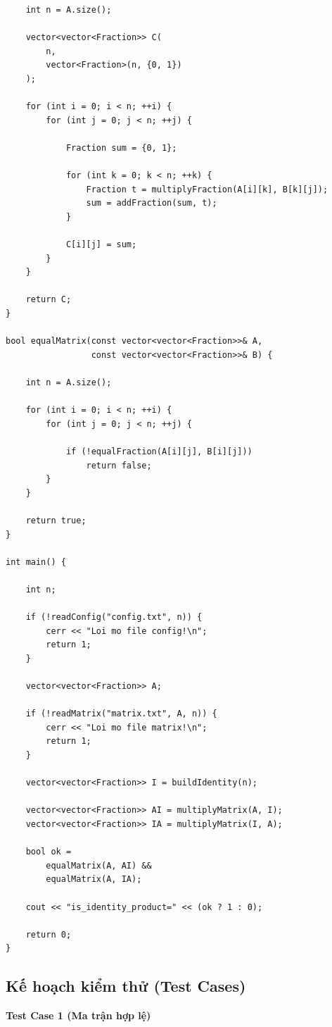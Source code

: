 \begin{lstlisting}
    int n = A.size();

    vector<vector<Fraction>> C(
        n,
        vector<Fraction>(n, {0, 1})
    );

    for (int i = 0; i < n; ++i) {
        for (int j = 0; j < n; ++j) {

            Fraction sum = {0, 1};

            for (int k = 0; k < n; ++k) {
                Fraction t = multiplyFraction(A[i][k], B[k][j]);
                sum = addFraction(sum, t);
            }

            C[i][j] = sum;
        }
    }

    return C;
}

bool equalMatrix(const vector<vector<Fraction>>& A,
                 const vector<vector<Fraction>>& B) {

    int n = A.size();

    for (int i = 0; i < n; ++i) {
        for (int j = 0; j < n; ++j) {

            if (!equalFraction(A[i][j], B[i][j]))
                return false;
        }
    }

    return true;
}

int main() {

    int n;

    if (!readConfig("config.txt", n)) {
        cerr << "Loi mo file config!\n";
        return 1;
    }

    vector<vector<Fraction>> A;

    if (!readMatrix("matrix.txt", A, n)) {
        cerr << "Loi mo file matrix!\n";
        return 1;
    }

    vector<vector<Fraction>> I = buildIdentity(n);

    vector<vector<Fraction>> AI = multiplyMatrix(A, I);
    vector<vector<Fraction>> IA = multiplyMatrix(I, A);

    bool ok =
        equalMatrix(A, AI) &&
        equalMatrix(A, IA);

    cout << "is_identity_product=" << (ok ? 1 : 0);

    return 0;
}
\end{lstlisting}

\subsection{Kế hoạch kiểm thử (Test Cases)}

\textbf{Test Case 1 (Ma trận hợp lệ)}

